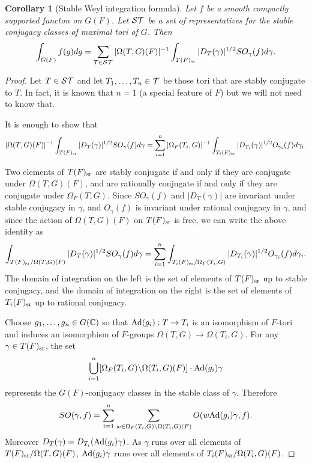 \documentclass{article}
\newtheorem{cor}[thm]{Corollary}
\theoremstyle{definition}
\numberwithin{equation}{section}
\renewcommand{\-}{\hyp{}}
\begin{document}
\begin{cor}[Stable Weyl integration formula] \label{cor:stabweyl}
	Let $f$ be a smooth compactly supported functon on $G(F)$. Let $\mathcal{ST}$ be a set of representatives for the stable conjugacy classes of maximal tori of $G$.
	Then
	\[ \int_{G(F)}f(g)dg = \sum_{T \in \mathcal{ST}}|\Omega(T,G)(F)|^{-1}\int_{T(F)_{\textrm{sr}}} |D_T(\gamma)|^{1/2}SO_\gamma(f)d\gamma. \]
\end{cor}
\begin{proof}
	Let $T \in \mathcal{ST}$ and let $T_1,\dots,T_n \in \mathcal{T}$ be those tori that  are stably conjugate to $T$. In fact, it is known that $n=1$ (a special feature of $F$) but we will not need to know that.
	
	It is enough to show that 
	\[ |\Omega(T,G)(F)|^{-1}\int_{T(F)_{\textrm{sr}}} |D_T(\gamma)|^{1/2}SO_\gamma(f)d\gamma = \sum_{i=1}^n|\Omega_F(T_i,G)|^{-1}\int_{T_i(F)_{\textrm{sr}}} |D_{T_i}(\gamma)|^{1/2}O_{\gamma_i}(f)d\gamma_i. \]
	
	Two elements of $T(F)_{\textrm{sr}}$ are stably conjugate if and only if they are conjugate under $\Omega(T,G)(F)$, and are rationally conjugate if and only if they are conjugate under $\Omega_F(T,G)$. Since $SO_\gamma(f)$ and $|D_T(\gamma)|$ are invariant under stable conjugacy in $\gamma$, and $O_\gamma(f)$ is invariant under rational conjugacy in $\gamma$, and since the action of $\Omega(T,G)(F)$ on $T(F)_{\textrm{sr}}$ is free,  we can write the above identity as 
	\[ \int_{T(F)_{\textrm{sr}}/\Omega(T,G)(F)} |D_{T}(\gamma)|^{1/2} SO_\gamma(f)d\gamma = \sum_{i=1}^n\int_{T_i(F)_{\textrm{sr}}/\Omega_F(T_i,G)} |D_{T_i}(\gamma)|^{1/2}O_{\gamma_i}(f)d\gamma_i. \]
	The domain of integration on the left is the set of elements of $T(F)_{\textrm{sr}}$ up to stable conjugacy, and the domain of integration on the right is the set of elements of $T_i(F)_{\textrm{sr}}$ up to rational conjugacy.

	Choose $g_1,\dots,g_n \in G(\mathbb{C})$ so that $\textrm{Ad}(g_i) : T \to T_i$ is an isomorphism of $F$-tori and induces an isomorphism of $F$-groups $\Omega(T,G) \to \Omega(T_i,G)$. For any $\gamma \in T(F)_{\textrm{sr}}$, the set 
	\[ \bigcup_{i=1}^n [\Omega_F(T_i,G) \backslash \Omega(T_i,G)(F)] \cdot \textrm{Ad}(g_i)\gamma \]
	represents the $G(F)$-conjugacy classes in the stable class of $\gamma$. Therefore 
	\[ SO(\gamma,f) = \sum_{i=1}^n \sum_{w \in \Omega_F(T_i,G) \backslash \Omega(T_i,G)(F)} O(w\textrm{Ad}(g_i)\gamma,f).\]
	Moreover $D_T(\gamma)=D_{T_i}(\textrm{Ad}(g_i)\gamma)$.
	As $\gamma$ runs over all elements of $T(F)_{\textrm{sr}}/\Omega(T,G)(F)$, $\textrm{Ad}(g_i)\gamma$ runs over all elements of $T_i(F)_{\textrm{sr}}/\Omega(T_i,G)(F)$.
\end{proof}
\end{document}
